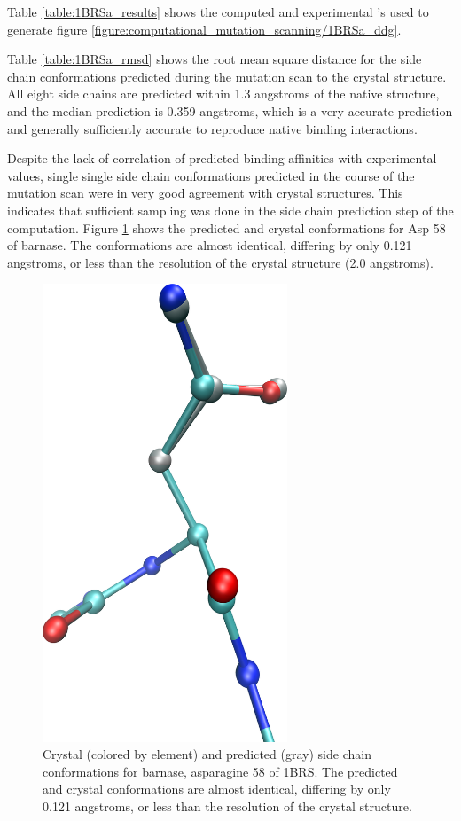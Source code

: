 Table \ref{table:1BRSa_results} shows the computed and experimental \ddg's used to generate figure \ref{figure:computational_mutation_scanning/1BRSa_ddg}.

Table \ref{table:1BRSa_rmsd} shows the root mean square distance for the side chain conformations predicted during the mutation scan to the crystal structure.
All eight side chains are predicted within 1.3 angstroms of the native structure, and the median prediction is 0.359 angstroms, which is a very accurate prediction and generally sufficiently accurate to reproduce native binding interactions.


Despite the lack of correlation of predicted binding affinities with experimental values, single single side chain conformations predicted in the course of the mutation scan were in very good agreement with crystal structures.
This indicates that sufficient sampling was done in the side chain prediction step of the computation.
Figure \ref{figure:computational_mutation_scanning/1brs_a_58} shows the predicted and crystal conformations for Asp 58 of barnase.
The conformations are almost identical, differing by only 0.121 angstroms, or less than the resolution of the crystal structure (2.0 angstroms).
\begin{figure}[h]
    \centering
    \includegraphics[width=0.65\textwidth,height=0.3\textheight,keepaspectratio]{figures/mutation_side_chain_images/1brs_chain_a_resid_58.png}
    \caption{Crystal (colored by element) and predicted (gray) side chain conformations for barnase, asparagine 58 of 1BRS.
    The predicted and crystal conformations are almost identical, differing by only 0.121 angstroms, or less than the resolution of the crystal structure.}
    \label{figure:computational_mutation_scanning/1brs_a_58}
\end{figure}

